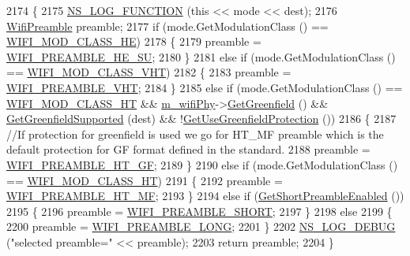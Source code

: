 \begin{DoxyCode}
2174 \{
2175   \hyperlink{log-macros-disabled_8h_a90b90d5bad1f39cb1b64923ea94c0761}{NS\_LOG\_FUNCTION} (\textcolor{keyword}{this} << mode << dest);
2176   \hyperlink{group__wifi_ga5e94a56cb338a14ffbbb19c6a41251eb}{WifiPreamble} preamble;
2177   \textcolor{keywordflow}{if} (mode.GetModulationClass () == \hyperlink{namespacens3_aa999e1221606a2b21b1eb33c2007c217abfa4f7272510045a9b43e8ac27ac13b0}{WIFI\_MOD\_CLASS\_HE})
2178     \{
2179       preamble = \hyperlink{group__wifi_gga5e94a56cb338a14ffbbb19c6a41251eba99c3e12c6e91fc9a9bee491d20dab807}{WIFI\_PREAMBLE\_HE\_SU};
2180     \}
2181   \textcolor{keywordflow}{else} \textcolor{keywordflow}{if} (mode.GetModulationClass () == \hyperlink{namespacens3_aa999e1221606a2b21b1eb33c2007c217a9863e4342bf5c238c74dddfc4d96c67e}{WIFI\_MOD\_CLASS\_VHT})
2182     \{
2183       preamble = \hyperlink{group__wifi_gga5e94a56cb338a14ffbbb19c6a41251ebab90b0fe0b17f27e51c0fe16239e7b089}{WIFI\_PREAMBLE\_VHT};
2184     \}
2185   \textcolor{keywordflow}{else} \textcolor{keywordflow}{if} (mode.GetModulationClass () == \hyperlink{namespacens3_aa999e1221606a2b21b1eb33c2007c217a6ac45cac36cc4454649435d24ebf349c}{WIFI\_MOD\_CLASS\_HT} && 
      \hyperlink{classns3_1_1WifiRemoteStationManager_a68cf308f39d3af06d148dae9268b9073}{m\_wifiPhy}->\hyperlink{classns3_1_1WifiPhy_ad7d61a882a8bd1ece3bcb76eeb600d28}{GetGreenfield} () && \hyperlink{classns3_1_1WifiRemoteStationManager_ad7e8b1cf473b5ce4a593d6dff8e038d1}{GetGreenfieldSupported} (dest) &&
       !\hyperlink{classns3_1_1WifiRemoteStationManager_a806dfd5b53fdabf3497cf3946236da34}{GetUseGreenfieldProtection} ())
2186     \{
2187       \textcolor{comment}{//If protection for greenfield is used we go for HT\_MF preamble which is the default protection for
       GF format defined in the standard.}
2188       preamble = \hyperlink{group__wifi_gga5e94a56cb338a14ffbbb19c6a41251eba82e0b00d79c1f01b7a6e46b693bafd72}{WIFI\_PREAMBLE\_HT\_GF};
2189     \}
2190   \textcolor{keywordflow}{else} \textcolor{keywordflow}{if} (mode.GetModulationClass () == \hyperlink{namespacens3_aa999e1221606a2b21b1eb33c2007c217a6ac45cac36cc4454649435d24ebf349c}{WIFI\_MOD\_CLASS\_HT})
2191     \{
2192       preamble = \hyperlink{group__wifi_gga5e94a56cb338a14ffbbb19c6a41251ebae0944a664debb28943c12d4cd7a81d2a}{WIFI\_PREAMBLE\_HT\_MF};
2193     \}
2194   \textcolor{keywordflow}{else} \textcolor{keywordflow}{if} (\hyperlink{classns3_1_1WifiRemoteStationManager_a3c14f412938ed4120572c5e0c5511d0f}{GetShortPreambleEnabled} ())
2195     \{
2196       preamble = \hyperlink{group__wifi_gga5e94a56cb338a14ffbbb19c6a41251ebab9a39ca1f62d36c33ac489c4cf59745b}{WIFI\_PREAMBLE\_SHORT};
2197     \}
2198   \textcolor{keywordflow}{else}
2199     \{
2200       preamble = \hyperlink{group__wifi_gga5e94a56cb338a14ffbbb19c6a41251eba12f3d9468d1630bd38bbef20df1e3eda}{WIFI\_PREAMBLE\_LONG};
2201     \}
2202   \hyperlink{group__logging_ga413f1886406d49f59a6a0a89b77b4d0a}{NS\_LOG\_DEBUG} (\textcolor{stringliteral}{"selected preamble="} << preamble);
2203   \textcolor{keywordflow}{return} preamble;
2204 \}
\end{DoxyCode}


